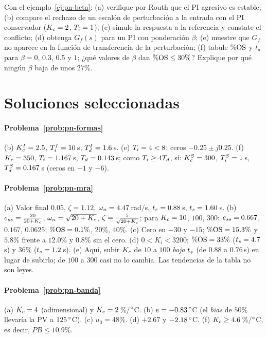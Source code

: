 \begin{problema}\label{prob:pn-beta}
Con el ejemplo~\ref{ej:pn-beta}: (a) verifique por Routh que el PI agresivo es estable; (b) \etiquetaM{} compare el rechazo de un escalón de perturbación a la entrada con el PI conservador ($K_c=2$, $T_i=1$); (c) simule la respuesta a la referencia y constate el conflicto; (d) obtenga $G_f(s)$ para un PI con ponderación $\beta$; (e) muestre que $G_f$ no aparece en la función de transferencia de la perturbación; (f) tabule $\%\mathrm{OS}$ y $t_s$ para $\beta=0$, $0.3$, $0.5$ y $1$; ¿qué valores de $\beta$ dan $\%\mathrm{OS}\le30\%$? Explique por qué ningún $\beta$ baja de unos $27\%$.
\end{problema}

\section{Soluciones seleccionadas}

\paragraph{Problema~\ref{prob:pn-formas}}
(b) $K_c^I=2.5$, $T_i^I=10$\,s, $T_d^I=1.6$\,s. (e) $T_i=4<8$; ceros $-0.25\pm j0.25$. (f) $K_c=350$, $T_i=1.167$\,s, $T_d=0.143$\,s; como $T_i\ge4T_d$, sí: $K_c^S=300$, $T_i^S=1$\,s, $T_d^S=0.167$\,s (ceros en $-1$ y $-6$).

\paragraph{Problema~\ref{prob:pn-mra}}
(a) Valor final $0.05$, $\zeta=1.12$, $\omega_n=4.47$\,rad/s, $t_r=0.88$\,s, $t_s=1.60$\,s. (b) $e_{ss}=\frac{20}{20+K_c}$, $\omega_n=\sqrt{20+K_c}$, $\zeta=\frac{5}{\sqrt{20+K_c}}$; para $K_c=10$, $100$, $300$: $e_{ss}=0.667$, $0.167$, $0.0625$; $\%\mathrm{OS}=0.1\%$, $20\%$, $40\%$. (c) Cero en $-30$ y $-15$; $\%\mathrm{OS}=15.3\%$ y $5.8\%$ frente a $12.0\%$ y $0.8\%$ sin el cero. (d) $0<K_i<3200$; $\%\mathrm{OS}=33\%$ ($t_s=4.7$\,s) y $36\%$ ($t_s=1.2$\,s). (e) Aquí, subir $K_c$ de $10$ a $100$ \emph{baja} $t_s$ (de $0.88$ a $0.76$\,s) en lugar de subirlo; de $100$ a $300$ casi no lo cambia. Las tendencias de la tabla no son leyes.

\paragraph{Problema~\ref{prob:pn-banda}}
(a) $K_c=4$ (adimensional) y $K_c=2$\,\%/$^{\circ}$C. (b) $e=-0.83\,^{\circ}$C (el \emph{bias} de $50\%$ llevaría la PV a $125\,^{\circ}$C). (c) $u_0=48\%$. (d) $+2.67$ y $-2.18\,^{\circ}$C. (f) $K_c\ge4.6$\,\%/$^{\circ}$C, es decir, $PB\le10.9\%$.

